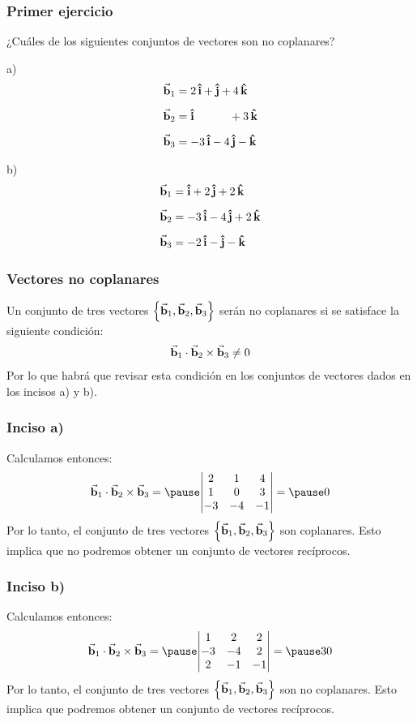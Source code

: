 \documentclass[12pt]{beamer}
\begin{document}
\begin{frame}
\frametitle{Primer ejercicio}
¿Cuáles de los siguientes conjuntos de vectores son no coplanares?
\\
\bigskip
\begin{minipage}{0.4\textwidth}
a) \begin{align*}
\va{b}_{1} &= 2 \, \vu{i} + \vu{j} + 4 \, \vu{k} \\[0.5em]
\va{b}_{2} &= \vu{i} \hspace{1.1cm} + 3 \, \vu{k} \\[0.5em]
\va{b}_{3} &= -3 \, \vu{i} - 4 \, \vu{j} - \vu{k}
\end{align*}
\end{minipage}
\hspace{0.3cm}
\pause
\begin{minipage}{0.4\textwidth}
b) \begin{align*}
\va{b}_{1} &= \vu{i} + 2 \, \vu{j} + 2 \, \vu{k} \\[0.5em]
\va{b}_{2} &= - 3 \, \vu{i} - 4 \, \vu{j} + 2 \, \vu{k} \\[0.5em]
\va{b}_{3} &= - 2 \, \vu{i} - \vu{j} - \vu{k}
\end{align*}
\end{minipage}
\end{frame}
\begin{frame}
\frametitle{Vectores no coplanares}
Un conjunto de tres vectores $\left\{ \va{b}_{1}, \va{b}_{2}, \va{b}_{3} \right\}$ serán no coplanares si se satisface la siguiente condición:
\pause
\begin{align*}
\va{b}_{1} \cdot \va{b}_{2} \times \va{b}_{3} \neq 0
\end{align*}
\pause
Por lo que habrá que revisar esta condición en los conjuntos de vectores dados en los incisos a) y b).
\end{frame}
\begin{frame}
\frametitle{Inciso a)}
Calculamos entonces:
\begin{eqnarray*}
\va{b}_{1} \cdot \va{b}_{2} \times \va{b}_{3} = \pause
\mqty|
2 & 1 & 4 \\
1 & 0 & 3 \\
-3 & -4 & -1 | = \pause 0
\end{eqnarray*}
\pause
Por lo tanto, el conjunto de tres vectores $\left\{ \va{b}_{1}, \va{b}_{2}, \va{b}_{3} \right\}$ son coplanares. \pause Esto implica que no podremos obtener un conjunto de vectores recíprocos.
\end{frame}
\begin{frame}
\frametitle{Inciso b)}
Calculamos entonces:
\begin{eqnarray*}
\va{b}_{1} \cdot \va{b}_{2} \times \va{b}_{3} = \pause
\mqty|
1 & 2 & 2 \\
-3 & -4 & 2 \\
2 & -1 & -1 | = \pause 30
\end{eqnarray*}
\pause
Por lo tanto, el conjunto de tres vectores $\left\{ \va{b}_{1}, \va{b}_{2}, \va{b}_{3} \right\}$ son no coplanares. \pause Esto implica que podremos obtener un conjunto de vectores recíprocos.
\end{frame}
\end{document}

